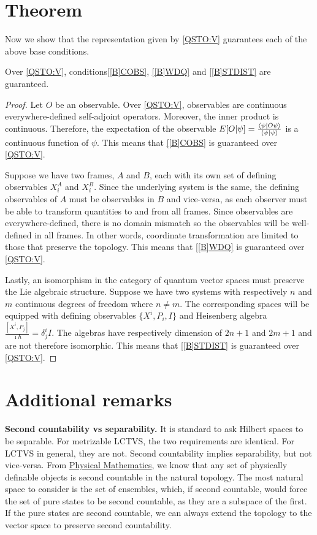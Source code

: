 \documentclass{techbrief}
\begin{document}
\section{Theorem}

Now we show that the representation given by \ref{QSTO:V} guarantees each of the above base conditions.

\begin{thrm}
	Over \ref{QSTO:V}, conditions\ref{[B]COBS}, \ref{[B]WDQ} and \ref{[B]STDIST} are guaranteed.
\end{thrm}

\begin{proof}
	Let $O$ be an observable. Over \ref{QSTO:V}, observables are continuous everywhere-defined self-adjoint operators. Moreover, the inner product is continuous. Therefore, the expectation of the observable $E[O|\psi] = \frac{ \langle \psi | O \psi \rangle}{\langle\psi|\psi\rangle}$ is a continuous function of $\psi$. This means that \ref{[B]COBS} is guaranteed over \ref{QSTO:V}.
	
	Suppose we have two frames, $A$ and $B$, each with its own set of defining observables $X_i^A$ and $X_i^B$. Since the underlying system is the same, the defining observables of $A$ must be observables in $B$ and vice-versa, as each observer must be able to transform quantities to and from all frames. Since observables are everywhere-defined, there is no domain mismatch so the observables will be well-defined in all frames. In other words, coordinate transformation are limited to those that preserve the topology. This means that \ref{[B]WDQ} is guaranteed over \ref{QSTO:V}.
	
	Lastly, an isomorphism in the category of quantum vector spaces must preserve the Lie algebraic structure. Suppose we have two systems with respectively $n$ and $m$ continuous degrees of freedom where $n \neq m$. The corresponding spaces will be equipped with defining observables $\{X^i, P_i, I\}$ and Heisenberg algebra $\frac{[X^i, P_j]}{\imath \hbar} = \delta^i_j I$. The algebras have respectively dimension of $2n+1$ and $2m+1$ and are not therefore isomorphic. This means that \ref{[B]STDIST} is guaranteed over \ref{QSTO:V}.
\end{proof}

\section{Additional remarks}

\textbf{Second countability vs separability.} It is standard to ask Hilbert spaces to be separable. For metrizable LCTVS, the two requirements are identical. For LCTVS in general, they are not. Second countability implies separability, but not vice-versa. From \href{https://assumptionsofphysics.org/autogen/AssumptionsOfPhysicsDraft.pdf#section.2.1.4}{Physical Mathematics}, we know that any set of physically definable objects is second countable in the natural topology. The most natural space to consider is the set of ensembles, which, if second countable, would force the set of pure states to be second countable, as they are a subspace of the first. If the pure states are second countable, we can always extend the topology to the vector space to preserve second countability.
\end{document}
